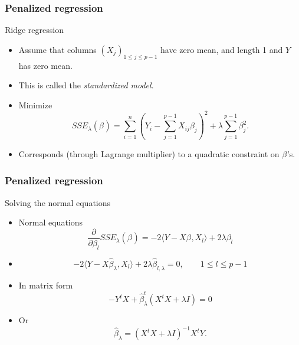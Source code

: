 \documentclass[handout]{beamer}
\newcommand{\B}[1]{\beta_{#1}}
\newcommand{\Bh}[1]{\widehat{\beta}_{#1}}
\begin{document}
   \begin{frame} \frametitle{Penalized regression}

   \begin{block}
   {Ridge regression}
       \begin{itemize}

       \item Assume that columns $(X_j)_{1 \leq j \leq p-1}$ have zero mean, and length 1 and $Y$ has zero mean.

       \item This is called the {\em standardized model}.
       \item Minimize
   {\small
   $$
   SSE_{\lambda}(\B{}) = \sum_{i=1}^n \left(Y_i - \sum_{j=1}^{p-1} X_{ij} \B{j}\right)^2 + \lambda \sum_{j=1}^{p-1} \B{j}^2.$$}

   \item Corresponds (through Lagrange multiplier) to a quadratic constraint on $\B{}$'s.

       \end{itemize}

   \end{block}
   \end{frame}


   \begin{frame} \frametitle{Penalized regression}

   \begin{block}
       {Solving the normal equations}
       \begin{itemize}
   \item Normal equations
   $$
   \frac{\partial}{\partial \B{l}} SSE_{\lambda}(\B{}) = -2  \langle Y - X\B{}, X_l \rangle + 2 \lambda \B{l}$$

       \item $$
   -2 \langle Y - X\Bh{\lambda}, X_l \rangle + 2 \lambda \Bh{l,\lambda} = 0, \qquad 1 \leq l \leq p-1$$

   \item In matrix form
   $$
   -Y^tX + \Bh{\lambda}^t (X^tX + \lambda I) = 0$$

   \item Or
   $$
   \Bh{\lambda} = (X^tX + \lambda I)^{-1} X^tY.$$
       \end{itemize}

   \end{block}
   \end{frame}
\end{document}
